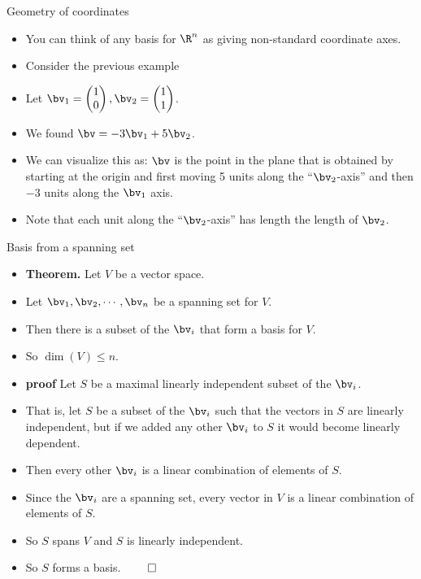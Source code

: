 \documentclass{beamer}
\begin{document}
\begin{frame}{Geometry of coordinates}

\begin{itemize}
\item You can think of any basis for $\R^n$ as giving non-standard coordinate axes.
\item Consider the previous example
\item Let $\bv_1 =
\begin{pmatrix}
1 \\ 0
\end{pmatrix}
,\bv_2=
\begin{pmatrix}
1 \\ 1
\end{pmatrix}
$.
\item We found  $\bv = -3\bv_1 + 5\bv_2$.
\item We can visualize this as: $\bv$ is the point in the plane that is
obtained by starting at the origin and first moving 5 units along the
``$\bv_2$-axis'' and then $-3$ units along the $\bv_1$ axis.
\item Note that each unit along the ``$\bv_2$-axis'' has length the
length of $\bv_2$.
\end{itemize}
\end{frame}
\begin{frame}{Basis from a spanning set}

\begin{itemize}
\item \textbf{Theorem.} Let $V$ be a vector space.
\item Let $\bv_1,\bv_2,\cdots,\bv_n$ be a spanning set for $V$.
\item Then there is a subset of the $\bv_i$ that form a basis for $V$.
\item So $\dim(V)\leq n$.
\item \textbf{proof} Let $S$ be a maximal linearly independent subset of the $\bv_i$.
\item That is, let $S$ be a subset of the $\bv_i$ such that the vectors in $S$ are linearly
independent, but if we added any other $\bv_i$ to $S$ it would become linearly dependent.
\item Then every other $\bv_i$ is a linear combination of elements of $S$.
\item Since the $\bv_i$ are a spanning set, every vector in $V$ is a linear combination of elements of $S$.
\item So $S$ spans $V$ and $S$ is linearly independent.
\item So $S$ forms a basis. $\qed$
\end{itemize}
\end{frame}
\end{document}
